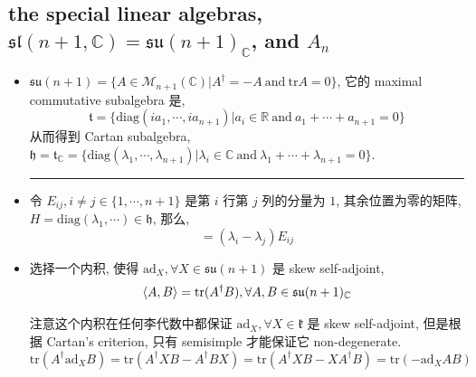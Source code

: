 \subsection{the special linear algebras, \texorpdfstring{$\mathfrak{sl}(n + 1, \mathbb{C}) = \mathfrak{su}(n + 1)_\mathbb{C}$}{sl(n + 1, C) = su(n + 1)\_C}, and \texorpdfstring{$A_n$}{A\_n}}
\begin{itemize}
	\item $\mathfrak{su}(n + 1) = \{A \in \mathcal{M}_{n + 1}(\mathbb{C}) | A^\dag = - A \ \text{and} \ \mathrm{tr} A = 0\}$, 它的 maximal commutative subalgebra 是,
	\begin{equation}
		\mathfrak{t} = \{\mathrm{diag}(i a_1, \cdots, i a_{n + 1}) | a_i \in \mathbb{R} \ \text{and} \ a_1 + \cdots + a_{n + 1} = 0\}
	\end{equation}
	从而得到 Cartan subalgebra, $\mathfrak{h} = \mathfrak{t}_\mathbb{C} = \{\mathrm{diag}(\lambda_1, \cdots, \lambda_{n + 1}) | \lambda_i \in \mathbb{C} \ \text{and} \ \lambda_1 + \cdots + \lambda_{n + 1} = 0\}$.
	
	\noindent\rule[0.5ex]{\linewidth}{0.5pt} %
	
	\item 令 $E_{i j}, i \neq j \in \{1, \cdots, n + 1\}$ 是第 $i$ 行第 $j$ 列的分量为 $1$, 其余位置为零的矩阵, $H = \mathrm{diag}(\lambda_1, \cdots) \in \mathfrak{h}$, 那么,
	\begin{equation}
		[H, E_{i j}] = (\lambda_i - \lambda_j) E_{i j}
	\end{equation}
	
	\item 选择一个内积, 使得 $\mathrm{ad}_X, \forall X \in \mathfrak{su}(n + 1)$ 是 skew self-adjoint,
	\begin{equation}
		\braket{A, B} = \mathrm{tr}(A^\dag B), \forall A, B \in \mathfrak{su}(n + 1)_\mathbb{C}
	\end{equation}
	
	\begin{tcolorbox}[title=proof:]
		注意这个内积在任何李代数中都保证 $\mathrm{ad}_X, \forall X \in \mathfrak{k}$ 是 skew self-adjoint, 但是根据 Cartan's criterion, 只有 semisimple 才能保证它 non-degenerate.
		\begin{equation}
			\mathrm{tr}(A^\dag \mathrm{ad}_X B) = \mathrm{tr}(A^\dag X B - A^\dag B X) = \mathrm{tr}(A^\dag X B - X A^\dag B) = \mathrm{tr}(- \mathrm{ad}_X A B)
		\end{equation}
	\end{tcolorbox}
	

\end{itemize}
